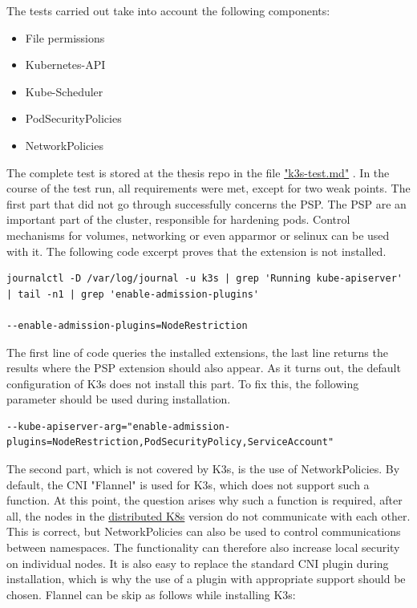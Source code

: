 \documentclass[MIC,Master,english]{twbook}%
\begin{document}
The tests carried out take into account the following components:
\begin{itemize}
    \itemsep0em
    \item File permissions
    \item Kubernetes-API
    \item Kube-Scheduler
    \item PodSecurityPolicies
    \item NetworkPolicies
\end{itemize}
The complete test is stored at the thesis repo \cite{bk-gh-repo} in the file \hyperref{RL: https://github.com/Berndinox/}{}{}{"k3s-test.md"} \cite{bk-gh-k3s-test}. In the course of the test run, all requirements were met, except for two weak points. The first part that did not go through successfully concerns the \ac{PSP}. The \ac{PSP} are an important part of the cluster, responsible for hardening pods. Control mechanisms for volumes, networking or even apparmor or selinux can be used with it. The following code excerpt proves that the extension is not installed.


\begin{lstlisting}[caption={K3s PSP test},captionpos=b]
journalctl -D /var/log/journal -u k3s | grep 'Running kube-apiserver' | tail -n1 | grep 'enable-admission-plugins'

--enable-admission-plugins=NodeRestriction 
\end{lstlisting}

The first line of code queries the installed extensions, the last line returns the results where the \ac{PSP} extension should also appear. As it turns out, the default configuration of K3s does not install this part. To fix this, the following parameter should be used during installation.

\begin{lstlisting}[basicstyle=\tiny,caption={K3s PSP install},captionpos=b]
--kube-apiserver-arg="enable-admission-plugins=NodeRestriction,PodSecurityPolicy,ServiceAccount"
\end{lstlisting}

The second part, which is not covered by K3s, is the use of NetworkPolicies. By default, the \ac{CNI} "Flannel"\cite{flannel} is used for K3s, which does not support such a function. At this point, the question arises why such a function is required, after all, the nodes in the \hyperref[sec:disk8s]{distributed K8s} version do not communicate with each other. This is correct, but NetworkPolicies can also be used to control communications between namespaces. The functionality can therefore also increase local security on individual nodes. It is also easy to replace the standard \ac{CNI} plugin during installation, which is why the use of a plugin with appropriate support should be chosen. Flannel can be skip as follows while installing K3s:
\end{document}
